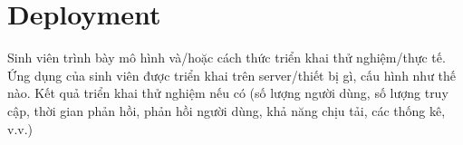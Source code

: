 \documentclass[../Main.tex]{subfiles}
\begin{document}
\section{Deployment}
Sinh viên trình bày mô hình và/hoặc cách thức triển khai thử nghiệm/thực tế. Ứng dụng của sinh viên được triển khai trên server/thiết bị gì, cấu hình như thế nào. Kết quả triển khai thử nghiệm nếu có (số lượng người dùng, số lượng truy cập, thời gian phản hồi, phản hồi người dùng, khả năng chịu tải, các thống kê, v.v.)
\end{document}
